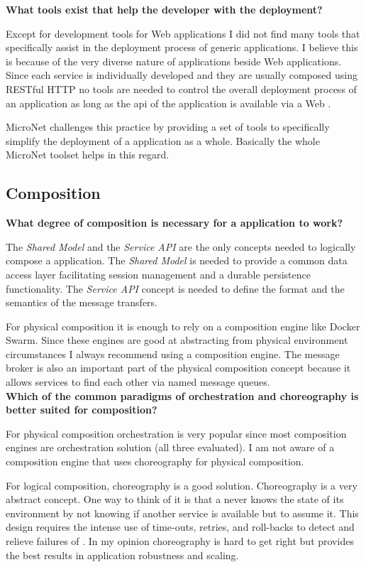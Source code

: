 \noindent
\textbf{What tools exist that help the developer with the deployment?}

Except for development tools for Web applications I did not find many tools that
specifically assist in the deployment process of generic \ms{} applications. I
believe this is because of the very diverse nature of \ms{} applications beside
Web applications. Since each service is individually developed and they are
usually composed using RESTful HTTP no tools are needed to control the overall
deployment process of an application as long as the \gls{api} of the application
is available via a Web \ms{}.

MicroNet challenges this practice by providing a set of tools to specifically
simplify the deployment of a \ms{} application as a whole. Basically the whole
MicroNet toolset helps in this regard.

\subsection{\ms{} Composition}

\noindent
\textbf{What degree of composition is necessary for a \ms{} application
to work?}

The \textit{Shared Model} and the \textit{Service API} are the only concepts
needed to logically compose a \ms{} application. The \textit{Shared Model} is
needed to provide a common data access layer facilitating session management and
a durable persistence functionality. The \textit{Service API} concept is needed
to define the format and the semantics of the message transfers.

For physical composition it is enough to rely on a composition engine like
Docker Swarm. Since these engines are good at abstracting from physical
environment circumstances I always recommend using a composition engine. The
message broker is also an important part of the physical composition concept
because it allows services to find each other via named message queues.\\

\noindent
\textbf{Which of the common paradigms of orchestration and choreography is
better suited for \ms{} composition?}

For physical composition orchestration is very popular since most composition
engines are orchestration solution (all three evaluated). I am not aware of a
composition engine that uses choreography for physical composition. 

For logical composition, choreography is a good solution. Choreography is a very
abstract concept. One way to think of it is that a \ms{} never knows the state
of its environment by not knowing if another service is available but to assume
it. This design requires the intense use of time-outs, retries, and roll-backs
to detect and relieve failures of \mss{}. In my opinion choreography is hard to
get right but provides the best results in application robustness and scaling.

